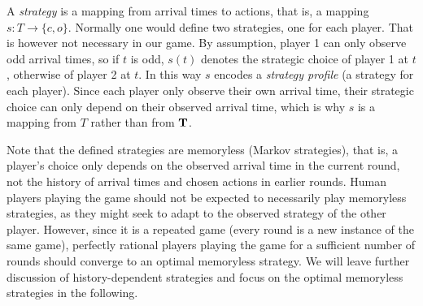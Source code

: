 \documentclass[twocolumn,a4paper,superscriptaddress,nofootinbib]{revtex4}
\begin{document}
A \emph{strategy} %
 is a mapping from arrival times to actions, that is, 
   a mapping $s: T \to \{c,o\}$. 
 Normally one would define two strategies, one for each player. That is however not necessary in our game. By assumption, player 1 can only observe odd arrival times, so if $t$ is odd, $s(t)$ denotes the strategic choice of player 1 at $t$, otherwise of player 2 at $t$. In this way $s$ encodes a \emph{strategy profile} (a strategy for each player). Since each player only observe their own arrival time, their strategic choice can only depend on their observed arrival time, which is why $s$ is a mapping from $T$ rather than from $\bf T$.   

Note that the defined strategies are memoryless (Markov strategies), that is, a player's choice only depends on the observed arrival time in the current round, not the history of arrival times and chosen actions in earlier rounds. Human players playing the game should not be expected to necessarily play memoryless strategies, as they might seek to adapt to the observed strategy of the other player. However, since it is a repeated game (every round is a new instance of the same game), perfectly rational players playing the game for a sufficient number of rounds should converge to an optimal memoryless strategy. We will leave further discussion of history-dependent strategies and focus on the optimal memoryless strategies in the following.
\end{document}
